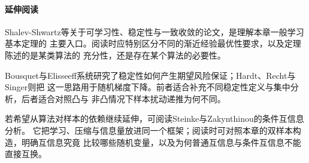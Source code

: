 \paragraph{延伸阅读}
Shalev-Shwartz等关于可学习性、稳定性与一致收敛的论文，是理解本章一般学习基本定理的
主要入口。阅读时应特别区分不同的渐近经验最优性要求，以及定理陈述的是某类算法的
充分性，还是存在某个算法的必要性。

Bousquet与Elisseeff系统研究了稳定性如何产生期望风险保证；Hardt、Recht与Singer则把
这一思路用于随机梯度下降。前者适合补充不同稳定性定义与集中分析，后者适合对照凸与
非凸情况下样本扰动递推为何不同。

若希望从算法对样本的依赖继续延伸，可阅读Steinke与Zakynthinou的条件互信息分析。
它把学习、压缩与信息量放进同一个框架；阅读时可对照本章的双样本构造，明确互信息究竟
比较哪些随机变量，以及为何普通互信息与条件互信息不能直接互换。
